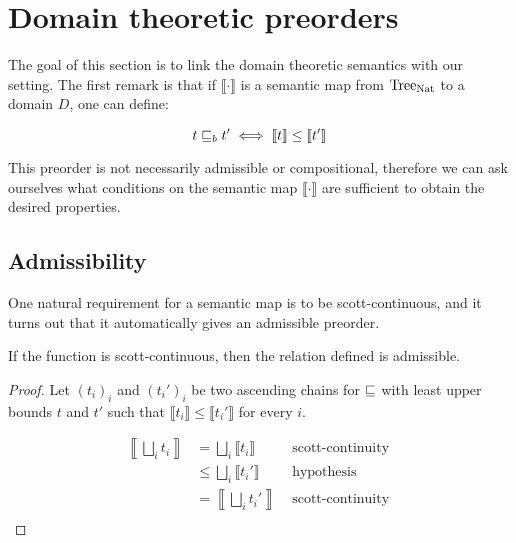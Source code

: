 
\section{Domain theoretic preorders}

The goal of this section is to link the domain theoretic semantics 
with our setting. The first remark is that if 
$\llbracket \cdot \rrbracket$ is a semantic map from $\textnormal{Tree}_{\textnormal{Nat}}$ to 
a domain $D$, one can define:

\begin{equation*}
    t \sqsubseteq_b t' \iff \llbracket t \rrbracket \leq \llbracket t' \rrbracket 
\end{equation*}

This preorder is not necessarily admissible or compositional, therefore 
we can ask ourselves what conditions on the semantic map $\llbracket \cdot
\rrbracket$ are sufficient to obtain the desired properties.

\begin{ensps}
\subsection{Admissibility}
\end{ensps}

One natural requirement for a semantic map is to be scott-continuous, and 
it turns out that it automatically gives an admissible preorder.

\begin{alemma}[Admissibility]
    \label{lem:continuousadm}
    If the function is scott-continuous, then the relation defined 
    is admissible.
\end{alemma}

\begin{ensps}
\begin{proof}
    Let $(t_i)_i$ and $(t_i')_i$ be two ascending chains for $\sqsubseteq$
    with least upper bounds $t$ and $t'$ such that $\llbracket t_i \rrbracket
    \leq \llbracket t_i' \rrbracket$ for every $i$.

    \begin{align*}
        \left\llbracket \bigsqcup_i t_i \right\rrbracket &= \bigsqcup_i \llbracket t_i
        \rrbracket & \text{ scott-continuity } \\
                   &\leq \bigsqcup_i \llbracket t_i' \rrbracket & 
                    \text{ hypothesis } \\
                   &= \left\llbracket \bigsqcup_i t_i' \right\rrbracket &
                    \text{ scott-continuity } \\
    \end{align*}

\end{proof}
\end{ensps}

